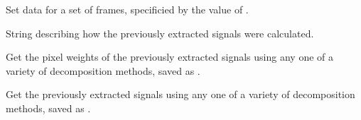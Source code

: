 \documentclass[letterpaper,10pt,english]{sphinxmanual}
\begin{document}
\begin{fulllineitems}

\begin{fulllineitems}
\label{\detokenize{xanespy:xanespy.txmstore.TXMStore.set_frames}}
Set data for a set of frames, specificied by the value of .

\end{fulllineitems}


\begin{fulllineitems}
\label{\detokenize{xanespy:xanespy.txmstore.TXMStore.signal_map}}
\end{fulllineitems}


\begin{fulllineitems}
\label{\detokenize{xanespy:xanespy.txmstore.TXMStore.signal_method}}
String describing how the previously extracted signals were
calculated.

\end{fulllineitems}


\begin{fulllineitems}
\label{\detokenize{xanespy:xanespy.txmstore.TXMStore.signal_weights}}
Get the pixel weights of the previously extracted signals using any
one of a variety of decomposition methods, saved as
.

\end{fulllineitems}


\begin{fulllineitems}
\label{\detokenize{xanespy:xanespy.txmstore.TXMStore.signals}}
Get the previously extracted signals using any one of a variety of
decomposition methods, saved as .

\end{fulllineitems}



\end{fulllineitems}
\end{document}
